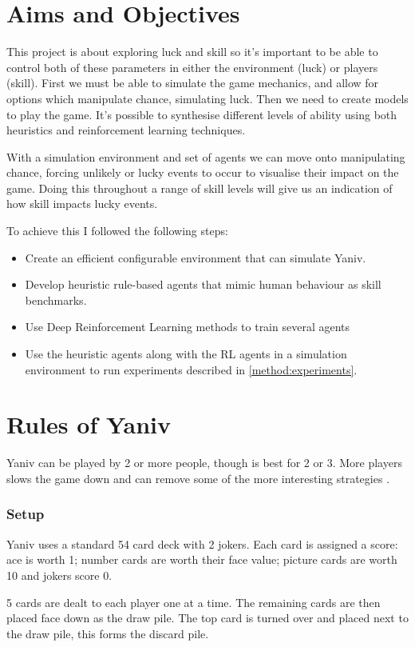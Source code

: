 \documentclass[../main.tex]{subfiles}
\begin{document}
\section{Aims and Objectives}
This project is about exploring luck and skill so it's important to be able to control both of these parameters in either the environment (luck) or players (skill). First we must be able to simulate the game mechanics, and allow for options which manipulate chance, simulating luck. Then we need to create models to play the game. It's possible to synthesise different levels of ability using both heuristics and reinforcement learning techniques. 

With a simulation environment and set of agents we can move onto manipulating chance, forcing unlikely or lucky events to occur to visualise their impact on the game. Doing this throughout a range of skill levels will give us an indication of how skill impacts lucky events. 

To achieve this I followed the following steps:
\begin{itemize}
    \item Create an efficient configurable environment that can simulate Yaniv.
    \item Develop heuristic rule-based agents that mimic human behaviour as skill benchmarks.
    \item Use Deep Reinforcement Learning methods to train several agents 
    \item Use the heuristic agents along with the RL agents in a simulation environment to run experiments described in \autoref{method:experiments}.
\end{itemize}


\section{Rules of Yaniv} \label{intro:rules}
Yaniv can be played by 2 or more people, though is best for 2 or 3. More players slows the game down and can remove some of the more interesting strategies \cite{noauthor_rules_nodate}. 

\subsubsection{Setup}
Yaniv uses a standard 54 card deck with 2 jokers. Each card is assigned a score: ace is worth 1; number cards are worth their face value; picture cards are worth 10 and jokers score 0. 

5 cards are dealt to each player one at a time. The remaining cards are then placed face down as the draw pile. The top card is turned over and placed next to the draw pile, this forms the discard pile. 
\end{document}
